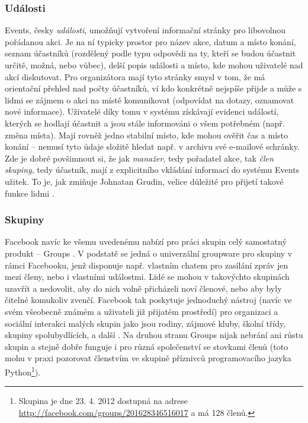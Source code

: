 \documentclass[12pt,oneside,final]{fithesis2}
\begin{document}
\subsubsection*{Události}
Events, česky {\it události}, umožňují vytvoření informační stránky pro libovolnou pořádanou akci. Je na ní typicky prostor pro název akce, datum a místo konání, seznam účastníků (rozdělený podle typu odpovědi na ty, kteří se budou účastnit určitě, možná, nebo vůbec), delší popis události a místo, kde mohou uživatelé nad akcí diskutovat. Pro organizátora mají tyto stránky smysl v tom, že má orientační přehled nad počty účastníků, ví kdo konkrétně nejspíše přijde a může s lidmi se zájmem o akci na místě komunikovat (odpovídat na dotazy, oznamovat nové informace). Uživatelé díky tomu v systému získávají evidenci událostí, kterých se hodlají účastnit a jsou stále informováni o všem potřebném (např. změna místa). Mají rovněž jedno stabilní místo, kde mohou ověřit čas a místo konání -- nemusí tyto údaje složitě hledat např. v archivu své e-mailové schránky. Zde je dobré povšimnout si, že jak {\it manažer}, tedy pořadatel akce, tak {\it člen skupiny}, tedy účastník, mají z explicitního vkládání informací do systému Events užitek. To je, jak zmiňuje Johnatan Grudin, velice důležité pro přijetí takové funkce lidmi \cite{grudin1994groupware}.

\subsubsection*{Skupiny}
Facebook navíc ke všemu uvedenému nabízí pro práci skupin celý samostatný produkt -- Groups \cite{chai2010new}. V podstatě se jedná o univerzální groupware pro skupiny v rámci Facebooku, jenž disponuje např. vlastním chatem pro zasílání zpráv jen mezi členy, nebo i vlastními událostmi. Lidé se mohou v takovýchto skupinách uzavřít a nedovolit, aby do nich volně přicházeli noví členové, nebo aby byly čitelné komukoliv zvenčí. Facebook tak poskytuje jednoduchý nástroj (navíc ve svém všeobecně známém a uživateli již přijatém prostředí) pro organizaci a sociální interakci malých skupin jako jsou rodiny, zájmové kluby, školní třídy, skupiny spolubydlících, a další \cite{novati2012introducing}. Na druhou stranu Groups nijak nebrání ani růstu skupin a stejně dobře funguje i pro různá společenství se stovkami členů (toto mohu v praxi pozorovat členstvím ve skupině příznivců programovacího jazyka Python\footnote{Skupina je dne 23. 4. 2012 dostupná na adrese \url{http://facebook.com/groups/201628346516017} a má 128 členů.}).
\end{document}
